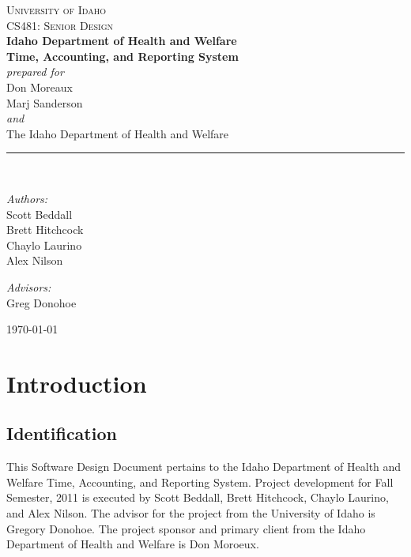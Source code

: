 \documentclass[letterpaper]{article}
\newcommand{\HRule}{\rule{5cm}{0.1mm}}
\begin{document}
\begin{center}



\textsc{\Large University of Idaho}\\[0.2cm]

\textsc{\Large CS481: Senior Design}\\[2cm]


{ \LARGE \bfseries Idaho Department of Health and Welfare}\\[0.4cm]
{ \huge \bfseries Time, Accounting, and Reporting System}\\[1.0cm]
{ \normalsize \emph{ prepared for}}\\[0.5cm]
{ \normalsize Don Moreaux}\\
{ \normalsize Marj Sanderson}\\[0.5cm]
{ \small \emph{and}}\\[0.5cm]
{ \normalsize The Idaho Department of Health and Welfare}\\[0.5cm]
\HRule \\[3cm]

\begin{minipage}{0.4\textwidth}
\begin{flushleft} \large
\emph{Authors:}\\
Scott Beddall\\
Brett Hitchcock\\
Chaylo Laurino\\
Alex Nilson
\end{flushleft}
\end{minipage}
\begin{minipage}{0.4\textwidth}
\begin{flushright} \large
\emph{Advisors:} \\
Greg Donohoe\\
\bigskip
\bigskip
\bigskip
\bigskip
\end{flushright}
\end{minipage}

{\large \today}

\end{center}
\pagebreak
\tableofcontents

\pagebreak
\section{\bfseries{Introduction}}
\subsection{\bfseries{Identification}}
This Software Design Document pertains to the Idaho Department of Health and Welfare Time, Accounting, and Reporting System. Project development for Fall Semester, 2011 is executed by Scott Beddall, Brett Hitchcock, Chaylo Laurino, and Alex Nilson. The advisor for the project from the University of Idaho is Gregory Donohoe. The project sponsor and primary client from the Idaho Department of Health and Welfare is Don Moroeux. 
\end{document}
